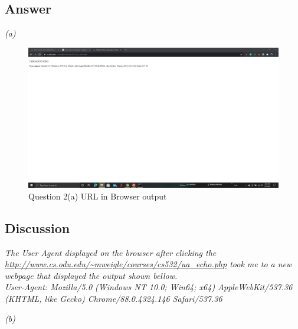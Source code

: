 \documentclass[12pt]{article}
\begin{document}
\subsection*{Answer}
\emph{(a)}
\begin{figure}[H]
    \centering
    \includegraphics[trim=0 10 0 50, clip, width=\textwidth] {browser.png}
    \caption{Question 2(a)  URL in Browser output}
    \label{fig:browser}
\end{figure}
\subsection*{Discussion}
\emph{The User Agent displayed on the browser after clicking the \url{ http://www.cs.odu.edu/~mweigle/courses/cs532/ua_echo.php} took me to a new webpage that displayed the output shown bellow. \\User-Agent: Mozilla/5.0 (Windows NT 10.0; Win64; x64) AppleWebKit/537.36 (KHTML, like Gecko) Chrome/88.0.4324.146 Safari/537.36}

\emph{(b)}
\end{document}
